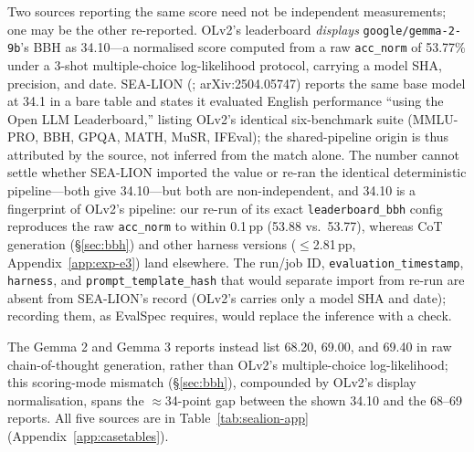 \documentclass[11pt]{article}
\begin{document}
Two sources reporting the same score need not be independent measurements; one may
be the other re-reported. OLv2's leaderboard \emph{displays} \texttt{google/gemma-2-9b}'s
BBH as 34.10---a normalised score computed from a raw \texttt{acc\_norm} of 53.77\%
under a 3-shot multiple-choice log-likelihood protocol, carrying a model SHA,
precision, and date. SEA-LION (\citealt{ng2025sealion}; arXiv:2504.05747) reports
the same base model at 34.1 in a bare table and states it evaluated English
performance ``using the Open LLM Leaderboard,'' listing OLv2's identical
six-benchmark suite (MMLU-PRO, BBH, GPQA, MATH, MuSR, IFEval); the shared-pipeline
origin is thus attributed by the source, not inferred from the match alone. The
number cannot settle whether SEA-LION imported the value or re-ran the identical
deterministic pipeline---both give 34.10---but both are non-independent, and 34.10
is a fingerprint of OLv2's pipeline: our re-run of its exact \texttt{leaderboard\_bbh}
config reproduces the raw \texttt{acc\_norm} to within 0.1\,pp (53.88 vs.\ 53.77),
whereas CoT generation (\S\ref{sec:bbh}) and other harness versions ($\le$2.81\,pp,
Appendix~\ref{app:exp-e3}) land elsewhere. The run/job ID,
\texttt{evaluation\_timestamp}, \texttt{harness}, and \texttt{prompt\_template\_hash}
that would separate import from re-run are absent from SEA-LION's record (OLv2's
carries only a model SHA and date); recording them, as EvalSpec requires, would
replace the inference with a check.

The Gemma 2 and Gemma 3 reports instead list 68.20, 69.00, and 69.40 in raw
chain-of-thought generation, rather than OLv2's multiple-choice log-likelihood; this
scoring-mode mismatch (\S\ref{sec:bbh}), compounded by OLv2's display normalisation,
spans the $\approx$34-point gap between the shown 34.10 and the 68--69 reports. All
five sources are in Table~\ref{tab:sealion-app} (Appendix~\ref{app:casetables}).
\end{document}

